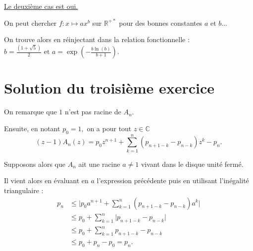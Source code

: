 \underline{ Le deuxième cas est oui.}

On peut chercher $f :x \mapsto ax^{b}$ sur $\mathbb{R}^{+*}$ pour des bonnes constantes $a$ et $b$... 

On trouve alors en réinjectant dans la relation fonctionnelle :  $\displaystyle b=\frac{(1+\sqrt{5})}{2} \mbox{ et } a=\exp(-\frac{b\ln(b)}{b+1}).$









\section{Solution du troisième exercice}

On remarque que $1$ n'est pas racine de $A_{n}.$

Ensuite, en notant $p_{0}=1,$ on a pour tout $z\in \mathbb{C}$ $$(z-1)A_{n}(z)=p_{0}z^{n+1}+\sum_{k=1}^{n}\left(p_{n+1-k}-p_{n-k}\right)z^{k}-p_{n}.$$

Supposons alors que $A_{n}$ ait une racine $a\neq 1$ vivant dans le disque unité fermé.

Il vient alors en évaluant en $a$ l'expression précédente puis en utilisant l'inégalité triangulaire : 
\begin{align*}
p_{n} & \leq \big\vert p_{0}a^{n+1}+\sum_{k=1}^{n}\left(p_{n+1-k}-p_{n-k}\right)a^{k}\big\vert\\
& \leq p_{0}+\sum_{k=1}^{n}\vert p_{n+1-k}-p_{n-k}\vert\\
& \leq p_{0}+ \sum_{k=1}^{n}p_{n+1-k}-p_{n-k}\\
& \leq p_{0}+p_{n}-p_{0}=p_{n}.
\end{align*}

